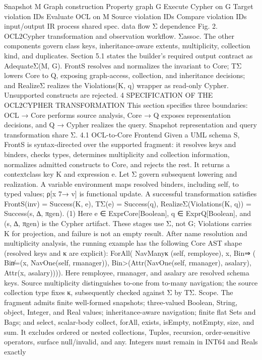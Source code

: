 Snapshot
M
Graph
construction
Property
graph
G
Execute
Cypher on G
Target
violation IDs
Evaluate OCL
on M
Source
violation IDs
Compare
violation IDs
input/output
IR
process
shared spec.
data flow
Σ dependence
Fig. 2. OCL2Cypher transformation and observation workflow.
Σassoc. The other components govern class keys, inheritance-aware extents, multiplicity,
collection kind, and duplicates. Section 5.1 states the builder’s required output contract
as AdequateΣ(M, G).
FrontS resolves and normalizes the invariant to Core; TΣ lowers Core to Q, exposing graph-access, collection, and inheritance decisions; and RealizeΣ realizes the
Violations(K, q) wrapper as read-only Cypher. Unsupported constructs are rejected.
4 SPECIFICATION OF THE OCL2CYPHER
TRANSFORMATION
This section specifies three boundaries: OCL → Core performs source analysis, Core
→ Q exposes representation decisions, and Q → Cypher realizes the query. Snapshot
representation and query transformation share Σ.
4.1 OCL-to-Core Frontend
Given a UML schema S, FrontS is syntax-directed over the supported fragment: it resolves keys and binders, checks types, determines multiplicity and collection information, normalizes admitted constructs to Core, and rejects the rest. It returns a contextclass key K and expression e. Let Σ govern subsequent lowering and realization. A
variable environment maps resolved binders, including self, to typed values; ρ[x 7→ v]
is functional update. A successful transformation satisfies
FrontS(inv) = Success(K, e),
TΣ(e) = Success(q),
RealizeΣ(Violations(K, q)) = Success(s, ∆, πgen).
(1)
Here e ∈ ExprCore[Boolean], q ∈ ExprQ[Boolean], and (s, ∆, πgen) is the Cypher artifact. These stages use Σ, not G; Violations carries K for projection, and failure is not
an empty result.
After name resolution and multiplicity analysis, the running example has the following Core AST shape (resolved keys and κ are explicit):
ForAll(
NavManyκ
(self, remployee), x,
Bin⇒
(
Bin̸=(x, NavOne(self, rmanager)),
Bin>(Attr(NavOne(self, rmanager), asalary), Attr(x, asalary)))).
Here remployee, rmanager, and asalary are resolved schema keys. Source multiplicity distinguishes to-one from to-many navigation; the source collection type fixes κ, subsequently
checked against Σ by TΣ.
Scope. The fragment admits finite well-formed snapshots; three-valued Boolean, String,
object, Integer, and Real values; inheritance-aware navigation; finite flat Sets and Bags;
and select, scalar-body collect, forAll, exists, isEmpty, notEmpty, size, and
sum. It excludes ordered or nested collections, Tuples, recursion, order-sensitive operators, surface null/invalid, and any. Integers must remain in INT64 and Reals exactly
